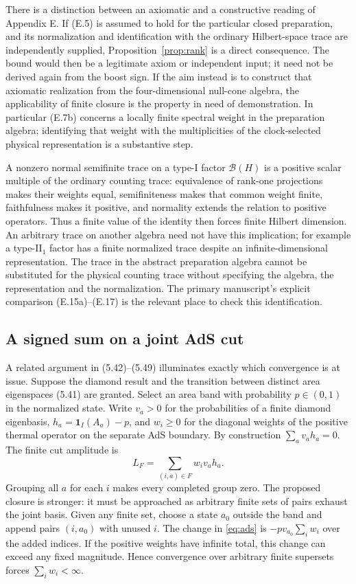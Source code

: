 \documentclass[11pt]{article}
\newcommand{\id}{\mathbf{1}}
\begin{document}
There is a distinction between an axiomatic and a constructive reading of Appendix E. If (E.5) is assumed to hold for the particular closed preparation, and its normalization and identification with the ordinary Hilbert-space trace are independently supplied, Proposition~\ref{prop:rank} is a direct consequence. The bound would then be a legitimate axiom or independent input; it need not be derived again from the boost sign. If the aim instead is to construct that axiomatic realization from the four-dimensional null-cone algebra, the applicability of finite closure is the property in need of demonstration. In particular (E.7b) concerns a locally finite spectral weight in the preparation algebra; identifying that weight with the multiplicities of the clock-selected physical representation is a substantive step.

A nonzero normal semifinite trace on a type-I factor $\mathcal B(H)$ is a positive scalar multiple of the ordinary counting trace: equivalence of rank-one projections makes their weights equal, semifiniteness makes that common weight finite, faithfulness makes it positive, and normality extends the relation to positive operators. Thus a finite value of the identity then forces finite Hilbert dimension. An arbitrary trace on another algebra need not have this implication; for example a type-II$_1$ factor has a finite normalized trace despite an infinite-dimensional representation. The trace in the abstract preparation algebra cannot be substituted for the physical counting trace without specifying the algebra, the representation and the normalization. The primary manuscript's explicit comparison (E.15a)--(E.17) is the relevant place to check this identification.

\subsection{A signed sum on a joint AdS cut}
A related argument in (5.42)--(5.49) illuminates exactly which convergence is at issue. Suppose the diamond result and the transition between distinct area eigenspaces (5.41) are granted. Select an area band with probability $p\in(0,1)$ in the normalized state. Write $v_a>0$ for the probabilities of a finite diamond eigenbasis, $h_a=\id_I(A_a)-p$, and $w_i\ge0$ for the diagonal weights of the positive thermal operator on the separate AdS boundary. By construction $\sum_a v_a h_a=0$. The finite cut amplitude is
\begin{equation}\label{eq:ads}
 L_F=\sum_{(i,a)\in F} w_i v_a h_a .
\end{equation}
Grouping all $a$ for each $i$ makes every completed group zero. The proposed closure is stronger: it must be approached as arbitrary finite sets of pairs exhaust the joint basis. Given any finite set, choose a state $a_0$ outside the band and append pairs $(i,a_0)$ with unused $i$. The change in \eqref{eq:ads} is $-p v_{a_0}\sum_i w_i$ over the added indices. If the positive weights have infinite total, this change can exceed any fixed magnitude. Hence convergence over arbitrary finite supersets forces $\sum_i w_i<\infty$.
\end{document}

